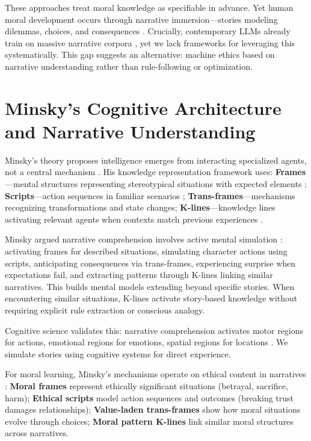 \documentclass[12pt]{article}
\begin{document}
These approaches treat moral knowledge as specifiable in advance. Yet human moral development occurs through narrative immersion---stories modeling dilemmas, choices, and consequences \citep{johnson1993moral, nussbaum1990love}. Crucially, contemporary LLMs already train on massive narrative corpora \citep{brown2020language, openai2023gpt4}, yet we lack frameworks for leveraging this systematically. This gap suggests an alternative: machine ethics based on narrative understanding rather than rule-following or optimization.

\section{Minsky's Cognitive Architecture and Narrative Understanding}

Minsky's theory proposes intelligence emerges from interacting specialized agents, not a central mechanism \citep{minsky1986society}. His knowledge representation framework uses: \textbf{Frames}---mental structures representing stereotypical situations with expected elements \citep{minsky1974framework}; \textbf{Scripts}---action sequences in familiar scenarios \citep{schank1977scripts}; \textbf{Trans-frames}---mechanisms recognizing transformations and state changes; \textbf{K-lines}---knowledge lines activating relevant agents when contexts match previous experiences \citep{minsky1986society}.

Minsky argued narrative comprehension involves active mental simulation \citep{minsky2006emotion}: activating frames for described situations, simulating character actions using scripts, anticipating consequences via trans-frames, experiencing surprise when expectations fail, and extracting patterns through K-lines linking similar narratives. This builds mental models extending beyond specific stories. When encountering similar situations, K-lines activate story-based knowledge without requiring explicit rule extraction or conscious analogy.

Cognitive science validates this: narrative comprehension activates motor regions for actions, emotional regions for emotions, spatial regions for locations \citep{zwaan2004constructionist, speer2009reading, hasson2004intersubject}. We simulate stories using cognitive systems for direct experience.

For moral learning, Minsky's mechanisms operate on ethical content in narratives \citep{nussbaum1990love}: \textbf{Moral frames} represent ethically significant situations (betrayal, sacrifice, harm); \textbf{Ethical scripts} model action sequences and outcomes (breaking trust damages relationships); \textbf{Value-laden trans-frames} show how moral situations evolve through choices; \textbf{Moral pattern K-lines} link similar moral structures across narratives.
\end{document}
